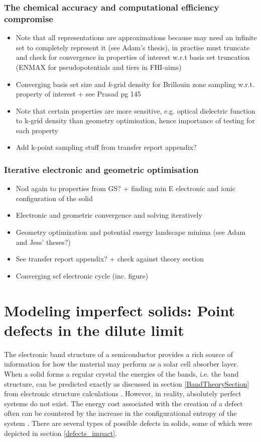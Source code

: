 \documentclass[11pt, twoside]{report}
\begin{document}
\subsubsection{The chemical accuracy and computational efficiency compromise}
\begin{itemize}
\item Note that all representations are approximations because may need an infinite set to completely represent it (see Adam's thesis), in practise must truncate and check for convergence in properties of interest w.r.t basis set truncation (ENMAX for pseudopotentials and tiers in FHI-aims)
\item Converging basis set size and \textit{k}-grid density for Brillouin zone sampling w.r.t. property of interest + see Prasad pg 145
\item Note that certain properties are more sensitive, e.g. optical dielectric function to k-grid density than geometry optimisation, hence importance of testing for each property
\item Add k-point sampling stuff from transfer report appendix?
\end{itemize}

\subsubsection{Iterative electronic and geometric optimisation}
\begin{itemize}
\item Nod again to properties from GS? + finding min E electronic and ionic configuration of the solid
\item Electronic and geometric convergence and solving iteratively
\item Geometry optimization and potential energy landscape minima (see Adam and Jess' theses?)
\item See transfer report appendix? + check against theory section
\item Converging scf electronic cycle (inc. figure)
\end{itemize}




\section{Modeling imperfect solids: Point defects in the dilute limit}\label{defects_methods}
The electronic band structure of a semiconductor provides a rich source of information for how the material may perform as a solar cell absorber layer. When a solid forms a regular crystal the energies of the bands, i.e. the band structure, can be predicted exactly as discussed in section \ref{BandTheorySection} from electronic structure calculations \cite{Nelson3}. However, in reality, absolutely perfect systems do not exist. The energy cost associated with the creation of a defect often can be countered by the increase in the configurational entropy of the system \cite{AshcroftMermin_general}.
There are several types of possible defects in solids, some of which were depicted in section \ref{defects_impact}. 
\end{document}
